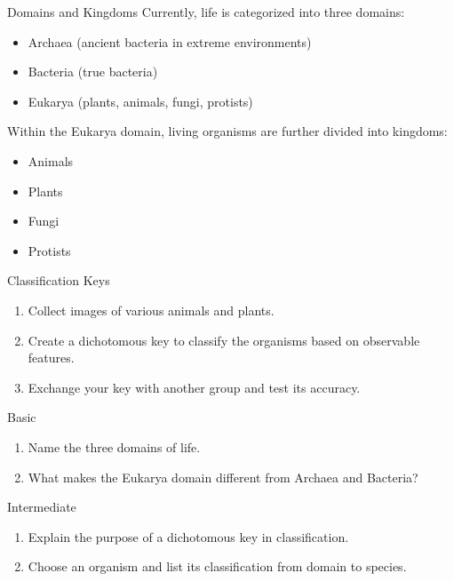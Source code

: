 \begin{keyconcept}{Domains and Kingdoms}
Currently, life is categorized into three domains:
\begin{itemize}
    \item Archaea (ancient bacteria in extreme environments)
    \item Bacteria (true bacteria)
    \item Eukarya (plants, animals, fungi, protists)
\end{itemize}

Within the Eukarya domain, living organisms are further divided into kingdoms:
\begin{itemize}
    \item Animals
    \item Plants
    \item Fungi
    \item Protists
\end{itemize}
\end{keyconcept}

\begin{investigation}{Classification Keys}
\begin{enumerate}
    \item Collect images of various animals and plants.
    \item Create a dichotomous key to classify the organisms based on observable features.
    \item Exchange your key with another group and test its accuracy.
\end{enumerate}
\end{investigation}

\begin{tieredquestions}{Basic}
\begin{enumerate}
    \item Name the three domains of life.
    \item What makes the Eukarya domain different from Archaea and Bacteria?
\end{enumerate}
\end{tieredquestions}

\begin{tieredquestions}{Intermediate}
\begin{enumerate}
    \item Explain the purpose of a dichotomous key in classification.
    \item Choose an organism and list its classification from domain to species.
\end{enumerate}
\end{tieredquestions}

